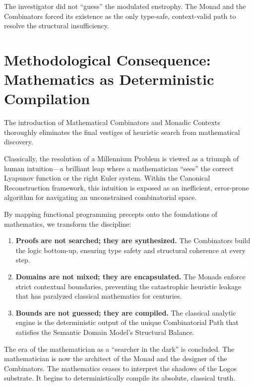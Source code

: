 \documentclass[12pt,openany]{extbook}
\theoremstyle{plain}
\theoremstyle{definition}
\begin{document}
The investigator did not ``guess'' the modulated enstrophy. The Monad and the Combinators forced its existence as the only type-safe, context-valid path to resolve the structural insufficiency.

\section{Methodological Consequence: Mathematics as Deterministic Compilation}

The introduction of Mathematical Combinators and Monadic Contexts thoroughly eliminates the final vestiges of heuristic search from mathematical discovery.

Classically, the resolution of a Millennium Problem is viewed as a triumph of human intuition---a brilliant leap where a mathematician ``sees'' the correct Lyapunov function or the right Euler system. Within the Canonical Reconstruction framework, this intuition is exposed as an inefficient, error-prone algorithm for navigating an unconstrained combinatorial space.

By mapping functional programming precepts onto the foundations of mathematics, we transform the discipline:
\begin{enumerate}
    \item \textbf{Proofs are not searched; they are synthesized.} The Combinators build the logic bottom-up, ensuring type safety and structural coherence at every step.
    \item \textbf{Domains are not mixed; they are encapsulated.} The Monads enforce strict contextual boundaries, preventing the catastrophic heuristic leakage that has paralyzed classical mathematics for centuries.
    \item \textbf{Bounds are not guessed; they are compiled.} The classical analytic engine is the deterministic output of the unique Combinatorial Path that satisfies the Semantic Domain Model's Structural Balance.
\end{enumerate}

The era of the mathematician as a ``searcher in the dark'' is concluded. The mathematician is now the architect of the Monad and the designer of the Combinators. The mathematics ceases to interpret the shadows of the Logos substrate. It begins to deterministically compile its absolute, classical truth.

\end{document}
